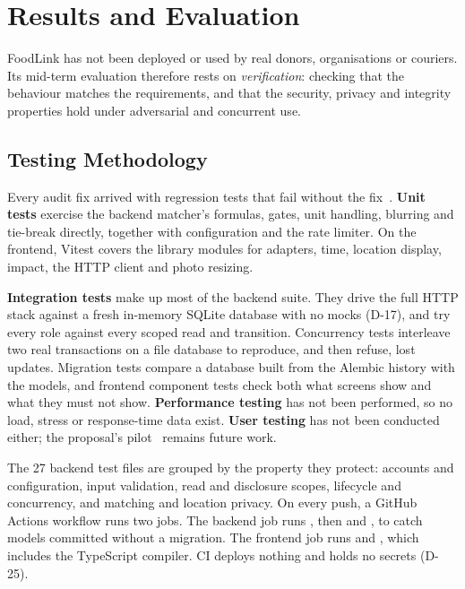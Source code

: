 \chapter{Results and Evaluation}
\label{ch:results}

FoodLink has not been deployed or used by real donors, organisations or
couriers. Its mid-term evaluation therefore rests on \emph{verification}:
checking that the behaviour matches the requirements, and that the security,
privacy and integrity properties hold under adversarial and concurrent use.

\section{Testing Methodology}
\label{sec:testing}

Every audit fix arrived with regression tests that fail without the
fix~\cite{pressman2015}. \textbf{Unit tests} exercise the backend matcher's
formulas, gates, unit handling, blurring and tie-break directly, together with
configuration and the rate limiter. On the frontend, Vitest covers the library
modules for adapters, time, location display, impact, the HTTP client and photo
resizing.

\textbf{Integration tests} make up most of the backend suite. They drive the
full HTTP stack against a fresh in-memory SQLite database with no mocks (D-17),
and try every role against every scoped read and transition. Concurrency tests
interleave two real transactions on a file database to reproduce, and then
refuse, lost updates. Migration tests compare a database built from the Alembic
history with the models, and frontend component tests check both what screens
show and what they must not show. \textbf{Performance testing} has not been
performed, so no load, stress or response-time data exist. \textbf{User
testing} has not been conducted either; the proposal's
pilot~\cite{foodlinkProposal} remains future work.

The 27 backend test files are grouped by the property they protect: accounts
and configuration, input validation, read and disclosure scopes, lifecycle and
concurrency, and matching and location privacy. On every push, a GitHub Actions
workflow runs two jobs. The backend job runs , then
 and , to catch models committed
without a migration. The frontend job runs  and
, which includes the TypeScript compiler. CI deploys nothing
and holds no secrets (D-25).

